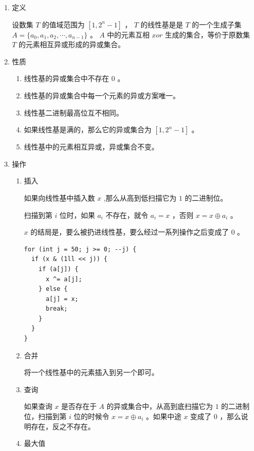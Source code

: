 \documentclass[11pt]{article}
\begin{document}
\begin{enumerate}
\item 定义
\label{sec-3-2-2-1}

设数集 $T$ 的值域范围为 $[1,2^n-1]$ ， $T$ 的线性基是是 $T$ 的一个生成子集 $A=\{a_0,a_1,a_2,\cdots,a_{n-1}\}$ 。 $A$ 中的元素互相 $xor$ 生成的集合，等价于原数集 $T$ 的元素相互异或形成的异或集合。

\item 性质
\label{sec-3-2-2-2}

\begin{enumerate}
\item 线性基的异或集合中不存在 $0$ 。
\item 线性基的异或集合中每一个元素的异或方案唯一。
\item 线性基二进制最高位互不相同。
\item 如果线性基是满的，那么它的异或集合为 $[1,2^n-1]$ 。
\item 线性基中的元素相互异或，异或集合不变。
\end{enumerate}

\item 操作
\label{sec-3-2-2-3}

\begin{enumerate}
\item 插入
\label{sec-3-2-2-3-1}

如果向线性基中插入数 $x$ ,那么从高到低扫描它为 $1$ 的二进制位。

扫描到第 $i$ 位时，如果 $a_i$ 不存在，就令 $a_i=x$ ，否则 $x=x \oplus a_i$ 。

$x$ 的结局是，要么被扔进线性基，要么经过一系列操作之后变成了 $0$ 。

\begin{verbatim}
for (int j = 50; j >= 0; --j) {
  if (x & (1ll << j)) {
    if (a[j]) {
      x ^= a[j];
    } else {
      a[j] = x;
      break;
    }
  }
}
\end{verbatim}

\item 合并
\label{sec-3-2-2-3-2}

将一个线性基中的元素插入到另一个即可。

\item 查询
\label{sec-3-2-2-3-3}

如果查询 $x$ 是否存在于 $A$ 的异或集合中，从高到底扫描它为 $1$ 的二进制位，扫描到第 $i$ 位的时候令 $x=x \oplus a_i$ 。如果中途 $x$ 变成了 $0$ ，那么说明存在，反之不存在。

\item 最大值
\label{sec-3-2-2-3-4}


\end{enumerate}
\end{enumerate}
\end{document}
